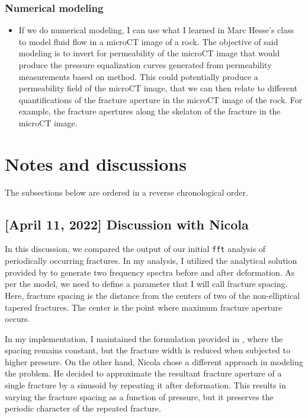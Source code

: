 \documentclass[12pt,titlepage]{article}
\begin{document}
\subsubsection{Numerical modeling}
\begin{itemize}
\item If we do numerical modeling, I can use what I learned in Marc Hesse's class to model fluid flow in a microCT image of a rock. The objective of said modeling is to invert for permeability of the microCT image that would produce the pressure equalization curves generated from permeability measurements based on \citep{Brace1968} method. This could potentially produce a permeability field of the microCT image, that we can then relate to different quantifications of the fracture aperture in the microCT image of the rock. For example, the fracture apertures along the skelaton of the fracture in the microCT image.
\end{itemize}

\section{Notes and discussions}
The subsections below are ordered in a reverse chronological order.
\subsection{[April 11, 2022] Discussion with Nicola}
In this discussion, we compared the output of our initial \texttt{fft} analysis of periodically occurring fractures. In my analysis, I utilized the analytical solution provided by \cite{Mavko1978} to generate two frequency spectra before and after deformation. As per the \citep{Mavko1978} model, we need to define a parameter that I will call fracture spacing. Here, fracture spacing is the distance from the centers of two of the non-elliptical tapered fractures. The center is the point where maximum fracture aperture occurs. 

In my implementation, I maintained the formulation provided in \citep{Mavko1978}, where the spacing remains constant, but the fracture width is reduced when subjected to higher pressure. On the other hand, Nicola chose a different approach in modeling the problem. He decided to approximate the resultant fracture aperture of a single fracture by a sinusoid by repeating it after deformation. This results in varying the fracture spacing as a function of pressure, but it preserves the periodic character of the repeated fracture. 
\end{document}
